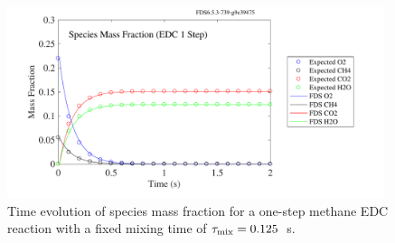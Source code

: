 \documentclass[11pt]{book}
\begin{document}
\begin{figure}[!ht]
\centering
\includegraphics[height=2.2in]{SCRIPT_FIGURES/reactionrate_EDC_flim_1step_CH4_spec}
\caption[Species evolution in a 1-step methane EDC reaction]{Time evolution of species mass fraction for a one-step methane EDC reaction with a fixed mixing time of $\tau_{\rm mix}=0.125$~s.}
\label{fig:EDC_1Step_meth_spec}
\end{figure}
\end{document}
